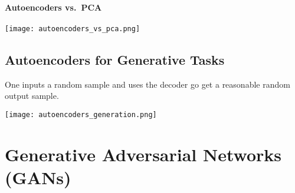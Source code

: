 \paragraph{Autoencoders vs.\ PCA}
\begin{center}
    \texttt{[image: autoencoders\_vs\_pca.png]}
\end{center}

\subsection{Autoencoders for Generative Tasks}
One inputs a random sample and uses the decoder go get a reasonable random output sample.
\begin{center}
    \texttt{[image: autoencoders\_generation.png]}
\end{center}

\section{Generative Adversarial Networks (GANs)}




